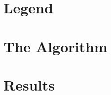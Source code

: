 

	\frontmatter
	\tableofcontents %
	\chapter{Legend}
	\newpage
	
\FloatBarrier
	\mainmatter
	\chapter{The Algorithm}
	
	\chapter{Results}
	
